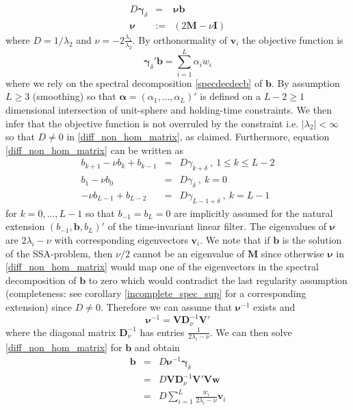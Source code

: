 \documentclass[a4paper]{article}
\begin{document}
\begin{eqnarray}\label{diff_non_hom_matrix}
D\boldsymbol{\gamma}_{\delta}&=& \boldsymbol{\nu}\mathbf{b}\\
\boldsymbol{\nu}&:=&(2\mathbf{M}-\nu\mathbf{I})\label{labelNu}
\end{eqnarray}
where $D=1/\lambda_2$  and $\nu=-2\frac{\lambda_1}{\lambda_2}$. By orthonormality of $\mathbf{v}_i$ the  objective function is
\[\boldsymbol{\gamma}_{\delta}'\mathbf{b}=\sum_{i=1}^L\alpha_iw_i\]
where we rely on the spectral decomposition \ref{specdecdecb} of $\mathbf{b}$. 
By assumption $L\geq 3$ (smoothing) so that $\boldsymbol{\alpha}=(\alpha_1,...,\alpha_L)' $ is defined on a  $L-2\geq 1$ dimensional intersection of unit-sphere and holding-time constraints. We then infer that the objective function is not overruled by the constraint i.e. $|\lambda_2|<\infty$ so that $D\neq 0$ in \ref{diff_non_hom_matrix}, as claimed. Furthermore, equation \ref{diff_non_hom_matrix} can be written as 
\begin{eqnarray}\label{ar2}
b_{k+1}-\nu b_k+b_{k-1}&=&D\gamma_{k+\delta}~,~1\leq k\leq L-2\\
b_{1}-\nu b_0&=&D\gamma_{\delta}~,~k=0\nonumber\\
-\nu b_{L-1}+b_{L-2}&=&D\gamma_{L-1+\delta}~,~k=L-1\nonumber
\end{eqnarray}
for $k=0,...,L-1$ so that $b_{-1}=b_L=0$ are implicitly assumed for the natural extension $(b_{-1},\mathbf{b},b_L)'$ of the time-invariant linear filter. The eigenvalues of $\boldsymbol{\nu}$ are $2\lambda_{i}-\nu$ with corresponding eigenvectors $\mathbf{v}_{i}$.  We note that if $\mathbf{b}$ is the solution of the SSA-problem, then $\nu/2$ cannot be an eigenvalue of $\mathbf{M}$ since otherwise $\boldsymbol{\nu}$ in \ref{diff_non_hom_matrix} would map one of the eigenvectors in the spectral decomposition of $\mathbf{b}$ to zero which would contradict the last regularity assumption (completeness: see corollary \ref{incomplete_spec_sup} for a corresponding extension) since $D\neq 0$. Therefore we can assume that $\boldsymbol{\nu}^{-1}$ exists and
\[
\boldsymbol{\nu}^{-1}=\mathbf{V}\mathbf{D}_{\nu}^{-1}\mathbf{V}'
\] 
where the diagonal matrix $\mathbf{D}_{\nu}^{-1}$ has entries $\frac{1}{2\lambda_{i}-\nu}$. We can then solve  \ref{diff_non_hom_matrix} for $\mathbf{b}$ and obtain
\begin{eqnarray}\label{diff_non_hom_matrixe}
\mathbf{b}&=&D\boldsymbol{\nu}^{-1}\boldsymbol{\gamma}_{\delta}\\
&=&D\mathbf{V}\mathbf{D}_{\nu}^{-1}\mathbf{V}' \mathbf{V}\mathbf{w}\nonumber\\
&=&D\sum_{i=1}^L \frac{w_i}{2\lambda_{i}-\nu}\mathbf{v}_{i}\label{specdecb}
\end{eqnarray}
\end{document}
